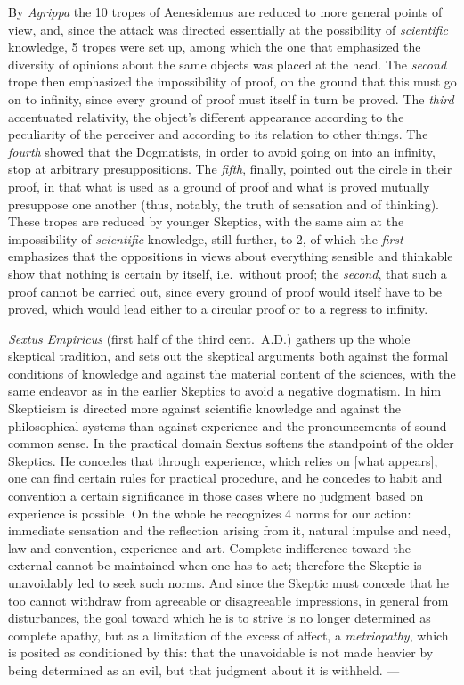 By \emph{Agrippa} the 10 tropes of Aenesidemus are reduced
to more general points of view, and, since the attack was directed essentially at the possibility of \emph{scientific} knowledge, 5 tropes were set up, among which the one that emphasized the diversity of opinions about the same objects was placed at the
head. The \emph{second} trope then emphasized the impossibility of
proof, on the ground that this must go on to infinity, since every ground of proof must itself in turn be proved. The
\emph{third} accentuated relativity, the object's different appearance according to the peculiarity of the perceiver and according to
its relation to other things. The \emph{fourth} showed that the Dogmatists,
in order to avoid going on into an infinity, stop at arbitrary
presuppositions. The \emph{fifth}, finally, pointed out the circle in their
proof, in that what is used as a ground of proof and what is
proved mutually presuppose one another (thus, notably,
the truth of sensation and of thinking). These tropes are reduced by younger Skeptics, with the same aim at the impossibility of
\emph{scientific} knowledge, still further, to
2, of which the \emph{first} emphasizes that the oppositions in views about everything sensible and thinkable show that nothing is
certain by itself, i.e.\ without proof; the \emph{second}, that such a
proof cannot be carried out, since every ground of proof would itself have to be proved, which would lead either to a circular proof or to a
regress to infinity.

\emph{Sextus Empiricus} (first half of the third cent.\
A.D.) gathers up the whole skeptical tradition, and sets out the skeptical arguments both against the formal conditions of knowledge and against
the material content of the sciences, with the same endeavor as in the earlier Skeptics to avoid a
negative dogmatism. In him Skepticism is directed more against
scientific knowledge and against the philosophical systems
than against experience and the pronouncements of sound common sense.
In the practical domain Sextus softens the standpoint of the older Skeptics.
He concedes that through experience,
which relies on  [what appears], one can find certain rules for
practical procedure, and he concedes to habit
and convention a certain significance in those cases where no judgment based on experience is possible. On the whole he recognizes 4
norms for our action: immediate sensation and the
reflection arising from it, natural impulse and need, law
and convention, experience and art. Complete indifference
toward the external cannot be maintained when one has to act; therefore
the Skeptic is unavoidably led to seek such norms. And
since the Skeptic must concede that he too cannot withdraw from agreeable or disagreeable impressions, in general
from disturbances, the goal toward which he is to strive is
no longer determined as complete apathy, but as
a limitation of the excess of affect, a \emph{metriopathy},
which is posited as conditioned by this: that the unavoidable is not made
heavier by being determined as an evil, but that judgment about
it is withheld. ---

